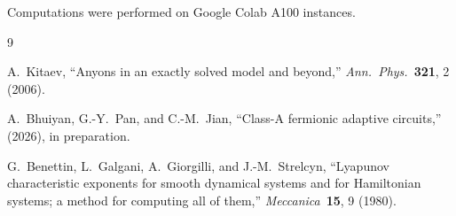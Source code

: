 \documentclass[aps,twocolumn,floatfix,superscriptaddress,nofootinbib]{revtex4-2}
\begin{document}
\begin{acknowledgments}
Computations were performed on Google Colab A100 instances.
\end{acknowledgments}

\begin{thebibliography}{9}

A.~Kitaev, ``Anyons in an exactly solved model and beyond,''
\textit{Ann.\ Phys.}\ \textbf{321}, 2 (2006).

A.~Bhuiyan, G.-Y.\ Pan, and C.-M.\ Jian,
``Class-A fermionic adaptive circuits,'' (2026), in preparation.

G.~Benettin, L.~Galgani, A.~Giorgilli, and J.-M.~Strelcyn,
``Lyapunov characteristic exponents for smooth dynamical systems and for
  Hamiltonian systems; a method for computing all of them,''
\textit{Meccanica}\ \textbf{15}, 9 (1980).

\end{thebibliography}
\end{document}
